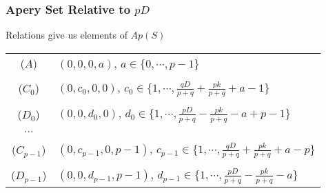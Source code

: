 \documentclass{beamer}
\begin{document}
\begin{frame}[noframenumbering]
\begin{center}
\frametitle{Apery Set Relative to $p D$}

Relations give us elements of $Ap(S)$\\

{\footnotesize
\begin{center}
\begin{tabular}{cl}
($A$) & $\left(0, 0, 0, a\right)$, $a \in \{ 0, \cdots, p - 1 \}$\\
 &\\
($C_0$) & $\left(0, c_0, 0, 0\right)$, $c_0 \in \{ 1, \cdots, \frac{q D}{p + q} + \frac{p k}{p + q} + a - 1 \}$\\
 &\\
($D_0$) & $\left(0, 0, d_0, 0\right)$, $d_0 \in \{ 1, \cdots, \frac{p D}{p + q} - \frac{p k}{p + q} - a + p - 1 \}$\\
 &\\
$\dots$ &\\
 &\\
($C_{p - 1}$) & $\left(0, c_{p - 1}, 0, p - 1\right)$, $c_{p - 1} \in \{ 1, \cdots, \frac{q D}{p + q} + \frac{p k}{p + q} + a - p \} $\\
 &\\
($D_{p - 1}$) & $\left(0, 0, d_{p - 1}, p - 1\right)$, $d_{p - 1} \in \{ 1, \cdots, \frac{p D}{p + q} - \frac{p k}{p + q} - a \} $\\
\end{tabular}
\end{center}
}

\end{center}
\end{frame}

\end{document}
